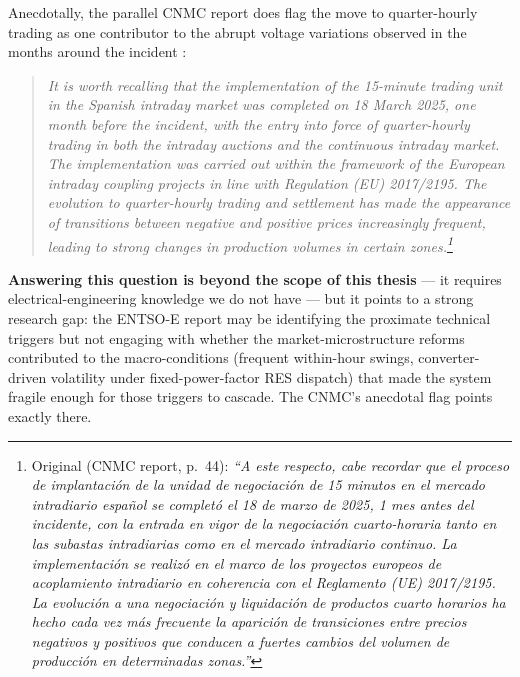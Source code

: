 \documentclass[11pt]{article}
\begin{document}
Anecdotally, the parallel CNMC report does flag the move to quarter-hourly trading as one contributor to the abrupt voltage variations observed in the months around the incident \citep[p.~44]{cnmc_blackout_recommendations_2026}:
\begin{quote}
\itshape It is worth recalling that the implementation of the 15-minute trading unit in the Spanish intraday market was completed on 18 March 2025, one month before the incident, with the entry into force of quarter-hourly trading in both the intraday auctions and the continuous intraday market. The implementation was carried out within the framework of the European intraday coupling projects in line with Regulation (EU) 2017/2195. The evolution to quarter-hourly trading and settlement has made the appearance of transitions between negative and positive prices increasingly frequent, leading to strong changes in production volumes in certain zones.\footnote{Original (CNMC report, p.~44): \emph{``A este respecto, cabe recordar que el proceso de implantaci\'on de la unidad de negociaci\'on de 15 minutos en el mercado intradiario espa\~nol se complet\'o el 18 de marzo de 2025, 1 mes antes del incidente, con la entrada en vigor de la negociaci\'on cuarto-horaria tanto en las subastas intradiarias como en el mercado intradiario continuo. La implementaci\'on se realiz\'o en el marco de los proyectos europeos de acoplamiento intradiario en coherencia con el Reglamento (UE) 2017/2195. La evoluci\'on a una negociaci\'on y liquidaci\'on de productos cuarto horarios ha hecho cada vez m\'as frecuente la aparici\'on de transiciones entre precios negativos y positivos que conducen a fuertes cambios del volumen de producci\'on en determinadas zonas.''}}
\end{quote}

\textbf{Answering this question is beyond the scope of this thesis} --- it requires electrical-engineering knowledge we do not have --- but it points to a strong research gap: the ENTSO-E report may be identifying the proximate technical triggers but not engaging with whether the market-microstructure reforms contributed to the macro-conditions (frequent within-hour swings, converter-driven volatility under fixed-power-factor RES dispatch) that made the system fragile enough for those triggers to cascade. The CNMC's anecdotal flag points exactly there.

\newpage



\end{document}

